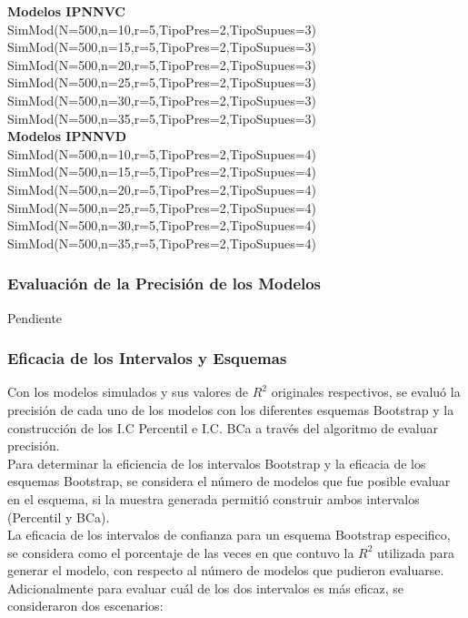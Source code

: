 \textbf{Modelos IPNNVC}\\
SimMod(N=500,n=10,r=5,TipoPres=2,TipoSupues=3)\\
SimMod(N=500,n=15,r=5,TipoPres=2,TipoSupues=3)\\
SimMod(N=500,n=20,r=5,TipoPres=2,TipoSupues=3)\\
SimMod(N=500,n=25,r=5,TipoPres=2,TipoSupues=3)\\
SimMod(N=500,n=30,r=5,TipoPres=2,TipoSupues=3)\\
SimMod(N=500,n=35,r=5,TipoPres=2,TipoSupues=3)\\

\textbf{Modelos IPNNVD}\\
SimMod(N=500,n=10,r=5,TipoPres=2,TipoSupues=4)\\
SimMod(N=500,n=15,r=5,TipoPres=2,TipoSupues=4)\\
SimMod(N=500,n=20,r=5,TipoPres=2,TipoSupues=4)\\
SimMod(N=500,n=25,r=5,TipoPres=2,TipoSupues=4)\\
SimMod(N=500,n=30,r=5,TipoPres=2,TipoSupues=4)\\
SimMod(N=500,n=35,r=5,TipoPres=2,TipoSupues=4)\\


\subsubsection{Evaluación de la Precisión de los Modelos}
Pendiente

\subsubsection{Eficacia de los Intervalos y Esquemas}

Con los modelos simulados y sus valores de $R^{2}$ originales respectivos, se evaluó la precisión de cada uno de los modelos con los diferentes esquemas Bootstrap y la construcción de los I.C Percentil e I.C. BCa a través del algoritmo de evaluar precisión.\\


Para determinar la eficiencia de los intervalos Bootstrap y la eficacia de los esquemas Bootstrap, se considera el número de modelos que fue posible evaluar en el esquema, si la muestra generada permitió construir ambos intervalos (Percentil y BCa).\\


La eficacia de los intervalos de confianza para un esquema Bootstrap especifico, se considera como el porcentaje de las veces en que contuvo la $R^{2}$ utilizada para generar el modelo, con respecto al número de modelos que pudieron evaluarse. Adicionalmente para evaluar cuál de los dos intervalos es más eficaz, se consideraron dos escenarios: 

